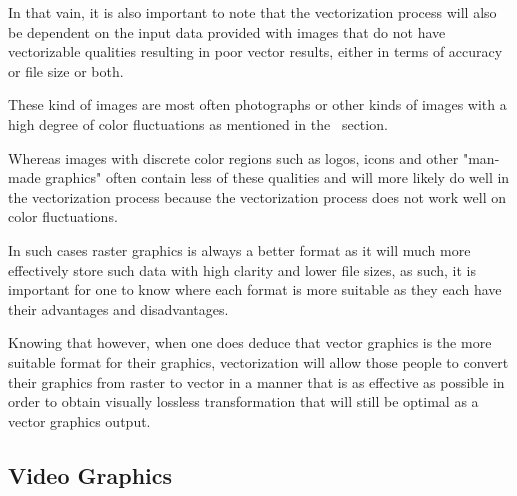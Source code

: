 \documentclass[12pt]{article}
\newcommand{\sentence}{} %
\begin{document}
    \bigskip
    \sentence
    In that vain, it is also important to note that the vectorization process will also be dependent on the input
    data provided with images that do not have vectorizable qualities resulting in poor vector results, either in
    terms of accuracy or file size or both.
    \sentence
    These kind of images are most often photographs or other kinds of images with a high degree of color fluctuations
    as mentioned in the~ section.
    \sentence
    Whereas images with discrete color regions such as logos, icons and other "man-made graphics" often contain less
    of these qualities and will more likely do well in the vectorization process because the vectorization process
    does not work well on color fluctuations.
    \sentence
    In such cases raster graphics is always a better format as it will much more effectively store such data with
    high clarity and lower file sizes, as such, it is important for one to know where each format is more suitable as
    they each have their advantages and disadvantages.
    \sentence
    Knowing that however, when one does deduce that vector graphics is the more suitable format for their graphics,
    vectorization will allow those people to convert their graphics from raster to vector in a manner that is as
    effective as possible in order to obtain visually lossless transformation that will still be optimal as a vector
    graphics output.

    \subsection{Video Graphics}\label{subsec:video-graphics}
\end{document}
